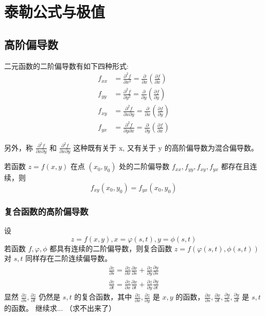 \section{泰勒公式与极值}

\subsection{高阶偏导数}

二元函数的二阶偏导数有如下四种形式:
\[
    \begin{aligned}
        f_{xx} & =\frac{\partial^2 f}{\partial x^2}=\frac{\partial}{\partial x}\left(\frac{\partial f}{\partial x}\right)         \\
        f_{yy} & =\frac{\partial^2 f}{\partial y^2}=\frac{\partial}{\partial y}\left(\frac{\partial f}{\partial y}\right)         \\
        f_{xy} & =\frac{\partial^2 f}{\partial x\partial y}=\frac{\partial}{\partial x}\left(\frac{\partial f}{\partial y}\right) \\
        f_{yx} & =\frac{\partial^2 f}{\partial y\partial x}=\frac{\partial}{\partial y}\left(\frac{\partial f}{\partial x}\right)
    \end{aligned}
\]

另外，称 $\frac{\partial^2 f}{\partial x\partial y}$ 和 $\frac{\partial^2 f}{\partial x\partial y}$ 这种既有关于 x, 又有关于 y 的高阶偏导数为混合偏导数。
\begin{theorem}
    若函数 $z=f(x,y)$ 在点 $(x_0,y_0)$ 处的二阶偏导数 $f_{xx},f_{yy},f_{xy},f_{yx}$ 都存在且连续，则
    \[
        f_{xy}(x_0,y_0)=f_{yx}(x_0,y_0)
    \]
\end{theorem}

\subsubsection{复合函数的高阶偏导数}

设
\[
    z=f(x,y), x=\varphi(s,t), y=\phi(s,t)
\]
若函数 $f,\varphi,\phi$ 都具有连续的二阶偏导数，则复合函数 $z=f(\varphi(s,t),\phi(s,t))$ 对 $s,t$ 同样存在二阶连续偏导数。
\[
    \begin{aligned}
        \frac{\partial z}{\partial s}=\frac{\partial z}{\partial x}\frac{\partial x}{\partial s}+\frac{\partial z}{\partial y}\frac{\partial y}{\partial s} \\
        \frac{\partial z}{\partial t}= \frac{\partial z}{\partial x}\frac{\partial x}{\partial t}+\frac{\partial z}{\partial y}\frac{\partial y}{\partial t}
    \end{aligned}
\]
显然 $\frac{\partial z}{\partial s},\frac{\partial z}{\partial t}$ 仍然是 $s,t$ 的复合函数，其中 $\frac{\partial z}{\partial x},\frac{\partial z}{\partial y}$ 是 $x,y$ 的函数，$\frac{\partial x}{\partial s},\frac{\partial x}{\partial t}, \frac{\partial y}{\partial s}, \frac{\partial y}{\partial t}$ 是 $s,t$ 的函数。
继续求... （求不出来了）